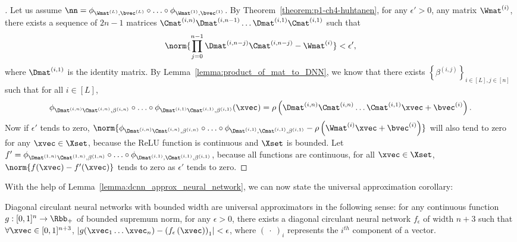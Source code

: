 \begin{proof}[]
  Let us assume $\nn = \phi_{\Wmat^{(L)}, \bvec^{(L)}} \circ \ldots \circ \phi_{\Wmat^{(1)}, \bvec^{(1)}}$.
  By Theorem~\ref{theorem:p1-ch4-huhtanen}, for any $\epsilon' > 0$, any matrix $\Wmat^{(i)}$, there exists a sequence of $2n-1$ matrices $\Cmat^{(i,n)} \Dmat^{(i,n-1)} \ldots \Dmat^{(i,1)} \Cmat^{(i,1)}$ such that 
  \begin{equation}
    \norm{\prod_{j=0}^{n-1} \Dmat^{(i,n-j)} \Cmat^{(i,n-j)} - \Wmat^{(i)}} < \epsilon' , 
  \end{equation}
  where $\Dmat^{(i,1)}$ is the identity matrix.
  By Lemma~\ref{lemma:product_of_mat_to_DNN}, we know that there exists $\left\{ \beta^{(i,j)} \right\}_{i \in[L], j \in [n]}$ such that for all $i\in[L]$, 
  \begin{equation}
    \phi_{\Dmat^{(i,n)} \Cmat^{(i, n)}, \beta^{(i, n)}} \circ \ldots \circ \phi_{\Dmat^{(i,1)} \Cmat^{(i, 1)}, \beta^{(i, 1)}}(\xvec) = \rho \left(\Dmat^{(i,n)} \Cmat^{(i,n)} \ldots \Cmat^{(i,1)} \xvec + \bvec^{(i)} \right).
  \end{equation}
  Now if $\epsilon'$ tends to zero, $\norm{ \phi_{\Dmat^{(i,n)} \Cmat^{(i,n)},\beta^{(i,n)}} \circ \ldots \circ \phi_{\Dmat^{(i,1)}, \Cmat^{(i,1)}, \beta^{(i,1)}} - \rho \left(\Wmat^{(i)} \xvec + \bvec^{(i)} \right)}$ will also tend to zero for any $\xvec \in \Xset$, because the ReLU function is continuous and $\Xset$ is bounded.
  Let $f' = \phi_{\Dmat^{(1,n)} \Cmat^{(1,n)},\beta^{(1,n)}} \circ \ldots \circ \phi_{\Dmat^{(i,1)}, \Cmat^{(i,1)}, \beta^{(i,1)}}$, because all functions are continuous, for all $\xvec \in \Xset$, $\norm{ f(\xvec) - f'(\xvec)} $ tends to zero as $\epsilon'$ tends to zero.
\end{proof}


\noindent
With the help of Lemma~\ref{lemma:dcnn_approx_neural_network}, we can now state the universal approximation corollary:

\begin{corollary} \label{corollary:universal}
  Diagonal circulant neural networks with bounded width are universal approximators in the following sense:
  for any continuous function $g:[0,1]^{n} \rightarrow \Rbb_+$ of bounded supremum norm, for any $\epsilon > 0$, there exists a diagonal circulant neural network $f_{\epsilon}$ of width $n+3$ such that $\forall \xvec \in [0,1]^{n+3}$, $\left| g(\xvec_{1} \ldots \xvec_{n}) - \left( f_{\epsilon} \left( \xvec \right) \right)_{1} \right| < \epsilon$, where $\left(\ \cdot\ \right)_{i}$ represents the $i^{th}$ component of a vector.
\end{corollary}


